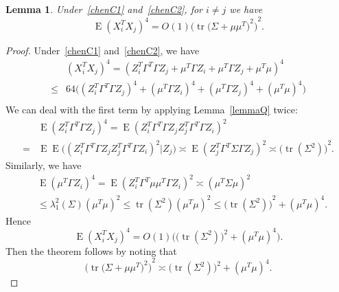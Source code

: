 \documentclass[review]{elsarticle}
\DeclareMathOperator{\mytr}{tr}
\DeclareMathOperator{\myE}{E}
\theoremstyle{plain}
\newtheorem{lemma}{Lemma}
\theoremstyle{definition}
\theoremstyle{remark}
\begin{document}
\begin{lemma}\label{smallLemma1}
    Under~\eqref{chenC1} and~\eqref{chenC2}, for $i\neq j$ we have
    \begin{equation}\label{eq:20170220}
        \myE{(X_i^T X_j)}^4=%
             O(1){\Big(\mytr {\big(\Sigma+\mu\mu^T\big)}^2\Big)}^2.
    \end{equation}
\end{lemma}
\begin{proof}

    Under~\eqref{chenC1} and~\eqref{chenC2}, we have
        \begin{equation*}
        \begin{aligned}
            &{(X_i^T X_j)}^4=
            {(Z_i^T \Gamma^T \Gamma Z_j+\mu^T \Gamma Z_i+\mu^T \Gamma Z_j+\mu^T \mu)}^4\\
            \leq &
            64\big((Z_i^T \Gamma^T \Gamma Z_j)^4+(\mu^T \Gamma Z_i)^4+(\mu^T \Gamma Z_j)^4+(\mu^T \mu)^4\big)\\
        \end{aligned}
        \end{equation*}
    We can deal with the first term by applying Lemma~\ref{lemmaQ} twice:
        \begin{equation*}
        \begin{aligned}
            &\myE(Z_i^T \Gamma^T \Gamma Z_j)^4=
        \myE(Z_i^T \Gamma^T \Gamma Z_j Z_j^T \Gamma^T \Gamma Z_i)^2\\
            =&
            \myE\myE\big((Z_i^T \Gamma^T \Gamma Z_j Z_j^T \Gamma^T \Gamma Z_i)^2 | Z_j\big)
            \asymp   \myE{(Z_j^T \Gamma^T \Sigma \Gamma Z_j)}^2
            \asymp   {\big(\mytr (\Sigma^2)\big)}^2.%
        \end{aligned}
        \end{equation*}
    Similarly, we have
        \begin{equation*}
        \begin{aligned}
            &\myE(\mu^T \Gamma Z_i)^4=
        \myE(Z_i^T \Gamma^T \mu\mu^T \Gamma Z_i)^2
            \asymp  {(\mu^T \Sigma \mu)}^2\\
            &\leq \lambda_{1}^2(\Sigma){(\mu^T \mu)}^2
        \leq \mytr (\Sigma^2){(\mu^T \mu)}^2
            \leq {\big(\mytr (\Sigma^2)\big)}^2+{(\mu^T \mu)}^4.
        \end{aligned}
        \end{equation*}
Hence
    \begin{equation*}
    \myE (X_i^T X_j)^4=O(1)\Big(\big(\mytr(\Sigma^2)\big)^2+(\mu^T \mu)^4\Big).
    \end{equation*}
Then the theorem follows by noting that
    \begin{equation*}
{\Big(\mytr {\big(\Sigma+\mu\mu^T\big)}^2\Big)}^2
\asymp
    \big(\mytr(\Sigma^2)\big)^2+(\mu^T \mu)^4.
    \end{equation*}
\end{proof}
\end{document}
